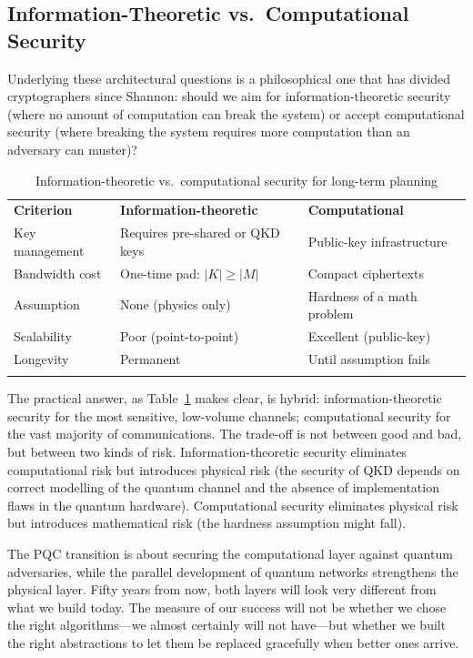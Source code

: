 \subsection{Information-Theoretic vs.\ Computational Security}
\label{subsec:it-vs-comp}

Underlying these architectural questions is a philosophical one that has divided cryptographers since Shannon: should we aim for information-theoretic security (where no amount of computation can break the system) or accept computational security (where breaking the system requires more computation than an adversary can muster)?

\begin{table}[t]
\caption{Information-theoretic vs.\ computational security for long-term planning}
\label{tab:it-vs-comp}
\begin{tabular}{p{3cm}p{4.5cm}p{4.5cm}}
\hline\noalign{\smallskip}
\textbf{Criterion} & \textbf{Information-theoretic} & \textbf{Computational} \\
\noalign{\smallskip}\svhline\noalign{\smallskip}
Key management & Requires pre-shared or QKD keys & Public-key infrastructure \\
Bandwidth cost & One-time pad: $|K| \geq |M|$ & Compact ciphertexts \\
Assumption & None (physics only) & Hardness of a math problem \\
Scalability & Poor (point-to-point) & Excellent (public-key) \\
Longevity & Permanent & Until assumption fails \\
\noalign{\smallskip}\hline
\end{tabular}
\end{table}

The practical answer, as Table~\ref{tab:it-vs-comp} makes clear, is hybrid: information-theoretic security for the most sensitive, low-volume channels; computational security for the vast majority of communications.  The trade-off is not between good and bad, but between two kinds of risk.  Information-theoretic security eliminates computational risk but introduces physical risk (the security of QKD depends on correct modelling of the quantum channel and the absence of implementation flaws in the quantum hardware).  Computational security eliminates physical risk but introduces mathematical risk (the hardness assumption might fall).

The PQC transition is about securing the computational layer against quantum adversaries, while the parallel development of quantum networks strengthens the physical layer.  Fifty years from now, both layers will look very different from what we build today.  The measure of our success will not be whether we chose the right algorithms---we almost certainly will not have---but whether we built the right abstractions to let them be replaced gracefully when better ones arrive.



